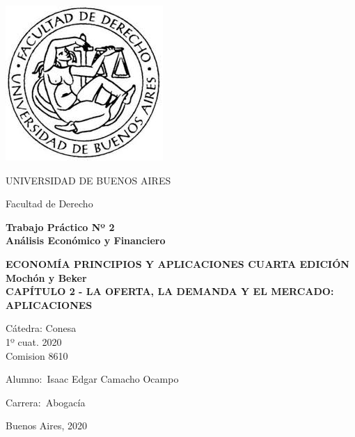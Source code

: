 \documentclass[12pt]{book}
\begin{document}
\thispagestyle{empty}

\vspace{3cm}
\begin {center}

\includegraphics[scale=.4]{descarga.jpeg}

\medskip
UNIVERSIDAD DE BUENOS AIRES

Facultad de Derecho

\vspace{3cm}


\textbf{\huge 	Trabajo Práctico Nº 2}
\\
\textbf{\huge Análisis Económico y Financiero}

\vspace{2cm}

\textbf{ECONOMÍA PRINCIPIOS Y APLICACIONES CUARTA EDICIÓN}
\\
\textbf{Mochón y Beker}
\\
\vspace{1cm}
\textbf{CAPÍTULO 2 - LA OFERTA, LA DEMANDA Y EL MERCADO: APLICACIONES}

\vspace{1cm}
Cátedra: Conesa
\\
1º cuat. 2020									            
\\
Comision 8610

\vspace{2cm}


\end {center}


\vspace{2cm}

\noindent Alumno:\,	Isaac Edgar Camacho Ocampo
 
\noindent Carrera:\,	Abogac\'ia

\vspace{1cm}

\noindent Buenos Aires, 2020


\tableofcontents
\end{document}
